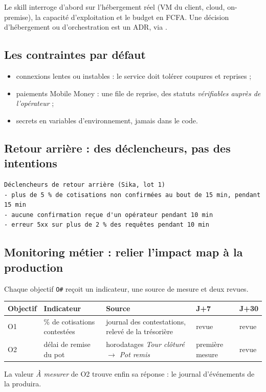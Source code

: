 Le skill interroge d'abord sur l'hébergement réel (VM du client, cloud, on-premise), la capacité d'exploitation et le budget
en FCFA. Une décision d'hébergement ou d'orchestration est un ADR, via .

\subsection*{Les contraintes par défaut}
\begin{itemize}
  \item connexions lentes ou instables : le service doit tolérer coupures et reprises ;
  \item paiements Mobile Money : une file de reprise, des statuts \emph{vérifiables auprès de l'opérateur} ;
  \item secrets en variables d'environnement, jamais dans le code.
\end{itemize}

\subsection*{Retour arrière : des déclencheurs, pas des intentions}
\begin{code}
\begin{Verbatim}
Déclencheurs de retour arrière (Sika, lot 1)
- plus de 5 % de cotisations non confirmées au bout de 15 min, pendant 15 min
- aucune confirmation reçue d'un opérateur pendant 10 min
- erreur 5xx sur plus de 2 % des requêtes pendant 10 min
\end{Verbatim}
\end{code}

\subsection*{Monitoring métier : relier l'impact map à la production}
Chaque objectif \texttt{O\#} reçoit un indicateur, une source de mesure et deux revues.
\noindent\begin{tabularx}{\linewidth}{llXll}
\toprule
\textbf{Objectif} & \textbf{Indicateur} & \textbf{Source} & \textbf{J+7} & \textbf{J+30} \\ \midrule
O1 & \% de cotisations contestées & journal des contestations, relevé de la trésorière & revue & revue \\
O2 & délai de remise du pot & horodatages \emph{Tour clôturé} $\to$ \emph{Pot remis} & première mesure & revue \\
\bottomrule
\end{tabularx}
La valeur \emph{À mesurer} de O2 trouve enfin sa réponse : le journal d'événements de \sika{} la produira.

